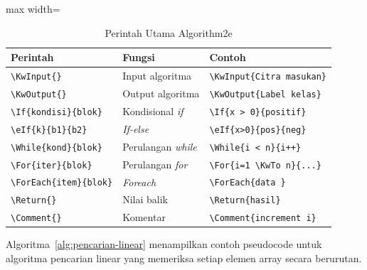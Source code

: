 \begin{table}[h]
  \centering
  \caption{Perintah Utama Algorithm2e}
  \label{tab:perintah-algoritma}
  \begin{adjustbox}{max width=\textwidth}
  \begin{tabular}{llp{6cm}}
    \toprule
    \textbf{Perintah} & \textbf{Fungsi} & \textbf{Contoh} \\
    \midrule
    \texttt{\textbackslash KwInput\{\}} & Input algoritma & \texttt{\textbackslash KwInput\{Citra masukan\}} \\
    \texttt{\textbackslash KwOutput\{\}} & Output algoritma & \texttt{\textbackslash KwOutput\{Label kelas\}} \\
    \texttt{\textbackslash If\{kondisi\}\{blok\}} & Kondisional \textit{if} & \texttt{\textbackslash If\{x > 0\}\{positif\}} \\
    \texttt{\textbackslash eIf\{k\}\{b1\}\{b2\}} & \textit{If-else} & \texttt{\textbackslash eIf\{x>0\}\{pos\}\{neg\}} \\
    \texttt{\textbackslash While\{kond\}\{blok\}} & Perulangan \textit{while} & \texttt{\textbackslash While\{i < n\}\{i++\}} \\
    \texttt{\textbackslash For\{iter\}\{blok\}} & Perulangan \textit{for} & \texttt{\textbackslash For\{i=1 \textbackslash KwTo n\}\{...\}} \\
    \texttt{\textbackslash ForEach\{item\}\{blok\}} & \textit{Foreach} & \texttt{\textbackslash ForEach\{data \}}\\
    \texttt{\textbackslash Return\{\}} & Nilai balik & \texttt{\textbackslash Return\{hasil\}} \\
    \texttt{\textbackslash Comment\{\}} & Komentar & \texttt{\textbackslash Comment\{increment i\}} \\
    \bottomrule
  \end{tabular}
  \end{adjustbox}
\end{table}

Algoritma~\ref{alg:pencarian-linear} menampilkan contoh pseudocode untuk algoritma pencarian linear yang memeriksa setiap elemen array secara berurutan.

\begin{algorithm}[h]
  \caption{Pencarian Linear}
  \label{alg:pencarian-linear}
  \;
\end{algorithm}

